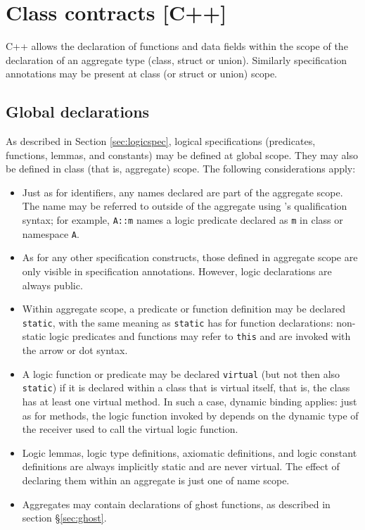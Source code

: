 \section{Class contracts [C++]}
\label{sec:class-contracts}

C++ allows the declaration of functions and data fields within
the scope of the declaration of an aggregate type (class, struct or union). Similarly \NAME specification annotations
may be present at class (or struct or union) scope.

\subsection{Global declarations}

As described in Section \ref{sec:logicspec}, logical specifications (predicates, functions, lemmas, and constants) may be defined at global scope. They may also be defined in class (that is, aggregate) scope. The following considerations apply:
\begin{itemize}
	\item Just as for \lang identifiers, any names 
	declared are part of the aggregate scope. The name may
	be referred to outside of the aggregate using \lang's 
	qualification syntax; for example, \lstinline|A::m| names a 
	logic predicate declared as \lstinline|m| in class
	or namespace \lstinline|A|.
	\item As for any other specification constructs, those defined in aggregate scope are only visible in specification annotations. However, logic declarations are always public.
	\item Within aggregate scope, a predicate or function definition may be
	declared \lstinline|static|, with the same meaning as 
	\lstinline|static| has for \lang function 
	declarations: non-static logic predicates and functions
	may refer to \lstinline|this| and are invoked with the
	\lang arrow or dot syntax.
	
	\item A logic function or predicate may be declared \lstinline|virtual| (but not then also \lstinline|static|) if it is declared within a class that is virtual itself, that is, the class has at least one \lang virtual method. In such a case, dynamic binding applies: just as for \lang methods,
	the logic function invoked by depends on the dynamic type of the receiver used to call the virtual logic function.

	\item Logic lemmas, logic type definitions, axiomatic definitions, and logic constant definitions are always implicitly static and are never virtual. The effect of declaring them within an aggregate is just one of name scope.
	
	\item Aggregates may contain declarations of ghost functions, as described in section \S\ref{sec:ghost}.
\end{itemize}

